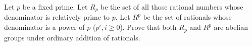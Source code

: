 Let \(p\) be a fixed prime. Let \(R_p\) be the set of all those rational
numbers whose denominator is relatively prime to \(p\). Let \(R^p\) be the set of
rationals whose denominator is a power of \(p\) (\(p^i,i\ge 0\)). Prove that both
\(R_p\) and \(R^p\) are abelian groups under ordinary addition of rationals.